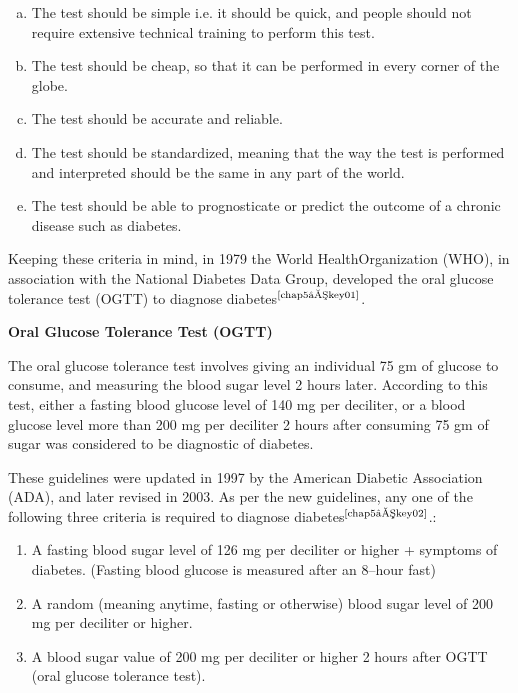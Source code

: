 \vspace{-\topsep}
\begin{enumerate}[a.]
\itemsep=0pt
\item The test should be simple i.e. it should be quick, and people should not require extensive technical training to perform this test.
 \item The test should be cheap, so that it can be performed in every corner of the globe.
 \item The test should be accurate and reliable.
 \item The test should be standardized, meaning that the way the test is performed and interpreted should be the same in any part of the world.
 \item The test should be able to prognosticate or predict the outcome of a chronic disease such as diabetes.
 \end{enumerate}
 \vspace{-\topsep}

Keeping these criteria in mind, in 1979 the World Health\break Organi\-zation (WHO), in association with the National Diabetes Data Group, developed the oral glucose tolerance test (OGTT) to diagnose diabetes$^{\text{\cite{chap5–key01}}}$.

\noindent
\textbf{Oral Glucose Tolerance Test (OGTT)}

The oral glucose tolerance test involves giving an individual 75 gm of glucose to consume, and measuring the blood sugar level 2 hours later. According to this test, either a fasting blood glucose level of 140 mg per deciliter, or a blood glucose level more than 200 mg per deciliter 2 hours after consuming 75 gm of sugar was considered to be diagnostic of diabetes.

These guidelines were updated in 1997 by the American Diabetic Association (ADA), and later revised in 2003. As per the new guidelines, any one of the following three criteria is required to diagnose diabetes$^{\text{\cite{chap5–key02}}}$.:

\vspace{-\topsep}
\begin{enumerate}
\itemsep=0pt
\item A fasting blood sugar level of 126 mg per deciliter or higher + symptoms of diabetes. (Fasting blood glucose is measured after an 8–hour fast)
\item A random (meaning anytime, fasting or otherwise) blood sugar level of 200 mg per deciliter or higher.
\item A blood sugar value of 200 mg per deciliter or higher 2 hours after OGTT (oral glucose tolerance test).
 \end{enumerate}
 \vspace{-\topsep}

